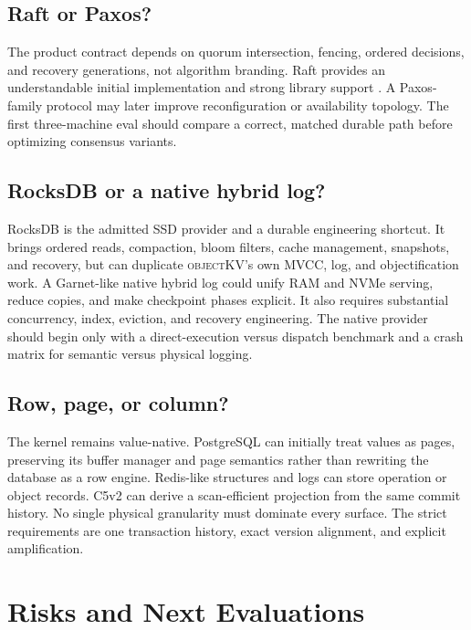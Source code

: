 \documentclass[sigconf,nonacm]{acmart}
\newcommand{\okv}{\textsc{objectKV}}
\begin{document}
\subsection{Raft or Paxos?}

The product contract depends on quorum intersection, fencing, ordered decisions,
and recovery generations, not algorithm branding. Raft provides an understandable
initial implementation and strong library support \cite{raft2014}. A Paxos-family
protocol may later improve reconfiguration or availability topology. The first
three-machine eval should compare a correct, matched durable path before
optimizing consensus variants.

\subsection{RocksDB or a native hybrid log?}

RocksDB is the admitted SSD provider and a durable engineering shortcut. It
brings ordered reads, compaction, bloom filters, cache management, snapshots,
and recovery, but can duplicate \okv{}'s own MVCC, log, and objectification work.
A Garnet-like native hybrid log could unify RAM and NVMe serving, reduce copies,
and make checkpoint phases explicit. It also requires substantial concurrency,
index, eviction, and recovery engineering. The native provider should begin only
with a direct-execution versus dispatch benchmark and a crash matrix for semantic
versus physical logging.

\subsection{Row, page, or column?}

The kernel remains value-native. PostgreSQL can initially treat values as pages,
preserving its buffer manager and page semantics rather than rewriting the
database as a row engine. Redis-like structures and logs can store operation or
object records. C5v2 can derive a scan-efficient projection from the same commit
history. No single physical granularity must dominate every surface. The strict
requirements are one transaction history, exact version alignment, and explicit
amplification.

\section{Risks and Next Evaluations}
\end{document}
